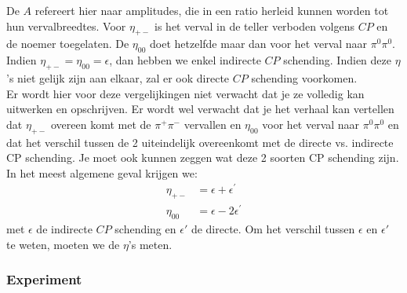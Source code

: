 \documentclass[../main.tex]{subfiles}
\begin{document}
De $A$ refereert hier naar amplitudes, die in een ratio herleid kunnen worden tot hun vervalbreedtes. Voor $\eta_{+-}$ is het verval in  de teller verboden volgens $CP$ en de noemer toegelaten. De $\eta_{00}$ doet hetzelfde maar dan voor het verval naar $\pi^0\pi^0$. Indien $\eta_{+-}=\eta_{00}=\epsilon$, dan hebben we enkel indirecte $CP$ schending. Indien deze $\eta$'s niet gelijk zijn aan elkaar, zal er ook directe $CP$ schending voorkomen.\\
{\color{red} Er wordt hier voor deze vergelijkingen niet verwacht dat je ze volledig kan uitwerken en opschrijven. Er wordt wel verwacht dat je het verhaal kan vertellen dat $\eta_{+-}$ overeen komt met de $\pi^+\pi^-$ vervallen en $\eta_{00}$ voor het verval naar $\pi^0\pi^0$ en dat het verschil tussen de 2 uiteindelijk overeenkomt met de directe vs. indirecte CP schending. Je moet ook kunnen zeggen wat deze 2 soorten CP schending zijn.}\\
In het meest algemene geval krijgen we:
\begin{equation}
    \begin{aligned}
        \label{eq:direct_indirect_algemeen}
        \eta_{+-} &=\epsilon+\epsilon^{\prime} \\
        \eta_{00} &=\epsilon-2 \epsilon^{\prime}
    \end{aligned}
\end{equation}
met $\epsilon$ de indirecte $CP$ schending en $\epsilon'$ de directe. Om het verschil tussen $\epsilon$ en $\epsilon'$ te weten, moeten we de $\eta$'s meten.

\subsubsection{Experiment}%
\label{ssub:experiment}
\end{document}
